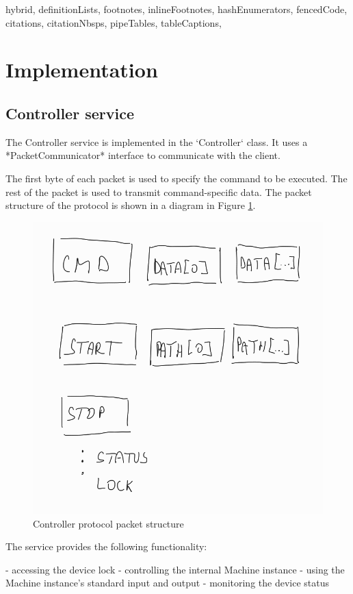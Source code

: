 \begin{markdown*}{%
  hybrid,
  definitionLists,
  footnotes,
  inlineFootnotes,
  hashEnumerators,
  fencedCode,
  citations,
  citationNbsps,
  pipeTables,
  tableCaptions,
}
\section{Implementation}

\subsection{Controller service}

The Controller service is implemented in the `Controller` class. It uses a *PacketCommunicator* interface to communicate with the client.

The first byte of each packet is used to specify the command to be executed. The rest of the packet is used to transmit command-specific data. The packet structure of the protocol is shown in a diagram in Figure \ref{fig:controller-protocol}.

\begin{figure}[ht]
    \centering
    \includegraphics[width=\textwidth]{img/controller-protocol}
    \caption{Controller protocol packet structure}
    \label{fig:controller-protocol}
\end{figure}

The service provides the following functionality:

  - accessing the device lock
  - controlling the internal Machine instance
  - using the Machine instance's standard input and output
  - monitoring the device status


\end{markdown*}
